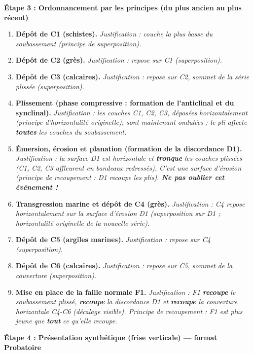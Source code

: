 \documentclass[11pt]{article}
\begin{document}
\begin{exoresolu}
\textbf{Étape 3 : Ordonnancement par les principes (du plus ancien au plus récent)}
\begin{enumerate}
    \item \textbf{Dépôt de C1 (schistes).} \textit{Justification : couche la plus basse du soubassement (principe de superposition).}
    \item \textbf{Dépôt de C2 (grès).} \textit{Justification : repose sur C1 (superposition).}
    \item \textbf{Dépôt de C3 (calcaires).} \textit{Justification : repose sur C2, sommet de la série plissée (superposition).}
    \item \textbf{Plissement (phase compressive : formation de l'anticlinal et du synclinal).} \textit{Justification : les couches C1, C2, C3, déposées horizontalement (principe d'horizontalité originelle), sont maintenant ondulées ; le pli affecte \textbf{toutes} les couches du soubassement.}
    \item \textbf{Émersion, érosion et planation (formation de la discordance D1).} \textit{Justification : la surface D1 est horizontale et \textbf{tronque} les couches plissées (C1, C2, C3 affleurent en bandeaux redressés). C'est une surface d'érosion (principe de recoupement : D1 recoupe les plis). \textbf{Ne pas oublier cet événement !}}
    \item \textbf{Transgression marine et dépôt de C4 (grès).} \textit{Justification : C4 repose horizontalement sur la surface d'érosion D1 (superposition sur D1 ; horizontalité originelle de la nouvelle série).}
    \item \textbf{Dépôt de C5 (argiles marines).} \textit{Justification : repose sur C4 (superposition).}
    \item \textbf{Dépôt de C6 (calcaires).} \textit{Justification : repose sur C5, sommet de la couverture (superposition).}
    \item \textbf{Mise en place de la faille normale F1.} \textit{Justification : F1 \textbf{recoupe} le soubassement plissé, \textbf{recoupe} la discordance D1 et \textbf{recoupe} la couverture horizontale C4-C6 (décalage visible). Principe de recoupement : F1 est plus jeune que \textbf{tout} ce qu'elle recoupe.}
\end{enumerate}

\textbf{Étape 4 : Présentation synthétique (frise verticale) — format Probatoire}


\end{exoresolu}
\end{document}
